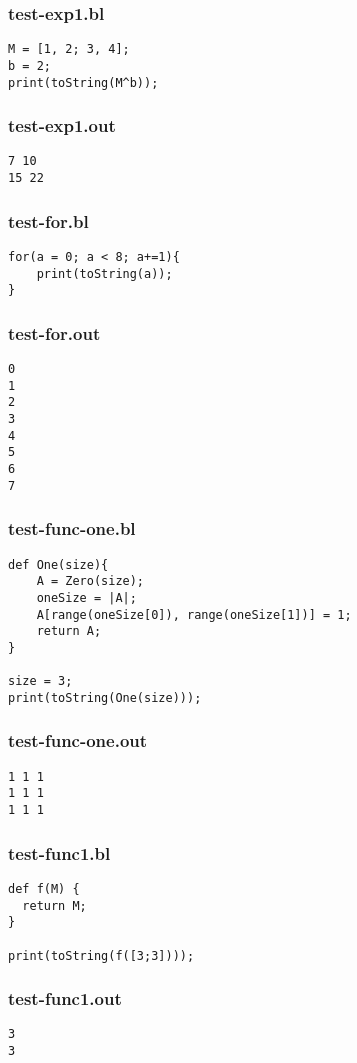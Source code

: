 \subsubsection{test-exp1.bl}
\begin{lstlisting}
M = [1, 2; 3, 4];
b = 2;
print(toString(M^b));\end{lstlisting}
\subsubsection{test-exp1.out}
\begin{lstlisting}
7 10 
15 22 \end{lstlisting}
\subsubsection{test-for.bl}
\begin{lstlisting}
for(a = 0; a < 8; a+=1){
    print(toString(a));
}
\end{lstlisting}
\subsubsection{test-for.out}
\begin{lstlisting}
0
1
2
3
4
5
6
7
\end{lstlisting}
\subsubsection{test-func-one.bl}
\begin{lstlisting}
def One(size){
    A = Zero(size);
    oneSize = |A|;
    A[range(oneSize[0]), range(oneSize[1])] = 1;
    return A;
}

size = 3;
print(toString(One(size)));
\end{lstlisting}
\subsubsection{test-func-one.out}
\begin{lstlisting}
1 1 1 
1 1 1 
1 1 1 
\end{lstlisting}
\subsubsection{test-func1.bl}
\begin{lstlisting}
def f(M) {
  return M;
}

print(toString(f([3;3])));
\end{lstlisting}
\subsubsection{test-func1.out}
\begin{lstlisting}
3 
3 
\end{lstlisting}
